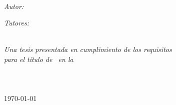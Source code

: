 \documentclass[
11pt, %
english, %
spanish,
singlespacing, %
liststotoc, %
headsepline, %
]{MastersDoctoralThesis} %
\begin{document}

\begin{titlepage}
\begin{center}
\vspace*{3cm}

{\huge \ttitle\par}\vspace{1cm} %
\HRule \\[2cm] %

\begin{minipage}[t]{0.4\textwidth}
\begin{flushleft} \large
\emph{Autor:}\\
\href{}{\authorname} %
\end{flushleft}
\end{minipage}
\begin{minipage}[t]{0.4\textwidth}
\begin{flushright} \large
\emph{Tutores:} \\
\href{}{\supname} %
\end{flushright}
\end{minipage}\\[2cm]

\large \textit{Una tesis presentada en cumplimiento de los requisitos\\ para el título de \degreename \ en la}\\[1cm]

\univname\\ %
\facname\\ %
\deptname \\[2cm]

{\large\today}\\[1cm] %

\vfill

\end{center}
\end{titlepage}


\end{document}
